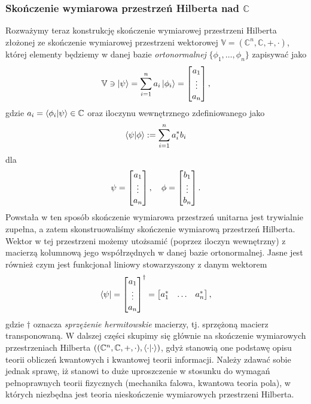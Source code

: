 \documentclass{myclass}
\begin{document}
\subsubsection*{Skończenie wymiarowa przestrzeń Hilberta nad $\mathbb{C}$}

Rozważymy teraz konstrukcję skończenie wymiarowej przestrzeni Hilberta złożonej ze skończenie
wymiarowej przestrzeni wektorowej \(\mathbb{V} = (\mathbb{C}^n, \mathbb{C}, +, \cdot)\), której
elementy będziemy w danej bazie \textit{ortonormalnej} \(\{\phi_1, \ldots, \phi_n\}\) zapisywać jako
\begin{equation*}
    \mathbb{V} \ni \ket{\psi} = \sum_{i=1}^n a_i \ket{\phi_i} = \mqty[a_1 \\ \vdots \\ a_n]\,,
\end{equation*}
gdzie \(a_i = \braket{\phi_i}{\psi}\in\mathbb{C}\) oraz iloczynu wewnętrznego zdefiniowanego jako
\begin{equation*}
    \braket{\psi}{\phi} := \sum_{i=1}^n a_{i}^*b_i
\end{equation*}
dla
\begin{equation*}
    \psi = \mqty[a_1 \\ \vdots \\ a_n]\,,\quad \phi = \mqty[b_1 \\ \vdots \\ b_n]\,.
\end{equation*}
Powstała w ten sposób skończenie wymiarowa przestrzeń unitarna jest trywialnie zupełna, a zatem
skonstruowaliśmy skończenie wymiarową przestrzeń Hilberta. Wektor w tej przestrzeni możemy utożsamić
(poprzez iloczyn wewnętrzny) z macierzą kolumnową jego współrzędnych w danej bazie ortonormalnej.
Jasne jest również czym jest funkcjonał liniowy stowarzyszony z danym wektorem
\begin{equation*}
    \bra{\psi} = \mqty[a_1 \\ \vdots \\ a_n]^\dagger = \mqty[a_1^* & \ldots & a_n^*]\,,
\end{equation*}
gdzie \(\dagger\) oznacza \textit{sprzężenie hermitowskie} macierzy, tj. sprzężoną macierz
transponowaną. W dalszej części skupimy się głównie na skończenie wymiarowych przestrzeniach
Hilberta \(((\mathbb{C}^n, \mathbb{C}, +, \cdot),\braket{\cdot})\), gdyż stanowią one podstawę opisu
teorii obliczeń kwantowych i kwantowej teorii informacji. Należy zdawać sobie jednak sprawę, iż
stanowi to duże uproszczenie w stosunku do wymagań pełnoprawnych teorii fizycznych (mechanika
falowa, kwantowa teoria pola), w których niezbędna jest teoria nieskończenie wymiarowych przestrzeni
Hilberta.
\end{document}
